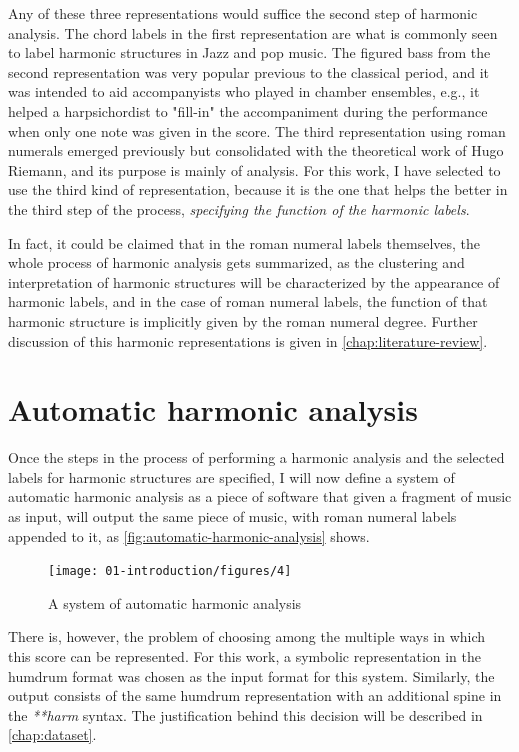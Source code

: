 Any of these three representations would suffice the second step of harmonic analysis. The chord labels in the first representation are what is commonly seen to label harmonic structures in Jazz and pop music. The figured bass from the second representation was very popular previous to the classical period, and it was intended to aid accompanyists who played in chamber ensembles, e.g., it helped a harpsichordist to "fill-in" the accompaniment during the performance when only one note was given in the score. The third representation using roman numerals emerged previously but consolidated with the theoretical work of Hugo Riemann, and its purpose is mainly of analysis. For this work, I have selected to use the third kind of representation, because it is the one that helps the better in the third step of the process, \emph{specifying the function of the harmonic labels}.

In fact, it could be claimed that in the roman numeral labels themselves, the whole process of harmonic analysis gets summarized, as the clustering and interpretation of harmonic structures will be characterized by the appearance of harmonic labels, and in the case of roman numeral labels, the function of that harmonic structure is implicitly given by the roman numeral degree. Further discussion of this harmonic representations is given in  \autoref{chap:literature-review}.

\section{Automatic harmonic analysis}
Once the steps in the process of performing a harmonic analysis and the selected labels for harmonic structures are specified, I will now define a system of automatic harmonic analysis as a piece of software that given a fragment of music as input, will output the same piece of music, with roman numeral labels appended to it, as \autoref{fig:automatic-harmonic-analysis} shows.

\begin{figure}[h]
  \centering
    \texttt{[image: 01-introduction/figures/4]}
  \caption{A system of automatic harmonic analysis}
  \label{fig:automatic-harmonic-analysis}
\end{figure}

There is, however, the problem of choosing among the multiple ways in which this score can be represented. For this work, a symbolic representation in the humdrum format was chosen as the input format for this system. Similarly, the output consists of the same humdrum representation with an additional spine in the \emph{**harm} syntax. The justification behind this decision will be described in \autoref{chap:dataset}.

